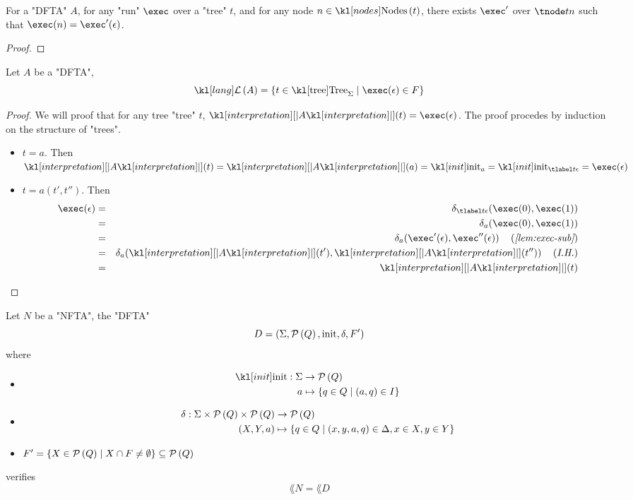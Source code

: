 \documentclass{article}
\begin{document}
\begin{lemma}\label{lem:exec-sub}
	For a "DFTA" $A$, for any "run" $\exec$ over a "tree" $t$, and for any node $n \in \nodes t$, there exists $\exec'$ over
	$\tnode t n$ such that $\exec (n) = \exec'(\epsilon)$.
\end{lemma}

\begin{proof}
	\todo{}
\end{proof}

\begin{lemma}
	Let $A$ be a "DFTA",
	\[ \lang A = \setdef {t \in \tree_{\Sigma}} {\exec (\epsilon) \in F} \]
\end{lemma}

\begin{proof}
	We will proof that for any tree  "tree" $t$, $\interpret A (t) = \exec (\epsilon)$.
	The proof procedes by induction on the structure of "trees".
	\begin{itemize}
		\item $t = a$. Then
		      $\interpret A (t) = \interpret A (a)=  \init_a = \init_{\tlabel t {\epsilon}} = \exec (\epsilon)$
		\item $t = a(t',t'')$. Then
		      \begin{eqnarray*}
			      \exec (\epsilon)  &=& \delta_{\tlabel t {\epsilon}}(\exec (0), \exec (1)) \\
			      &=& \delta_a (\exec (0), \exec (1)) \\
			      &=& \delta_a (\exec' (\epsilon), \exec''  (\epsilon))  \reason{\ref{lem:exec-sub}}\\
			      &=& \delta_a (\interpret A (t'), \interpret A (t'')) \reason{I.H.}\\
			      &=& \interpret A (t)
		      \end{eqnarray*}
	\end{itemize}
\end{proof}

\begin{theorem}
	Let $N$ be a "NFTA", the "DFTA"
	\[ D = (\Sigma, \mathcal{P}\left(Q\right), \text{init} , \delta , F' ) \]
	where
	\begin{itemize}
		\item \begin{align*}
			      \init : \Sigma & \to      \parts Q                        \\
			      a              & \mapsto  \setdef {q \in Q} {(a,q) \in I}
		      \end{align*}
		\item \begin{align*}
			      \delta   : \Sigma \times \mathcal{P}\left(Q\right) \times \mathcal{P}\left(Q\right) & \to \mathcal{P}\left(Q\right)                                                        \\
			      ( X, Y, a)                                        & \mapsto \left\{q \in  Q \mid (x,y,a,q) \in \Delta, x \in X, y \in Y\right\}
		      \end{align*}
		\item $F'  = \left\{X \in \mathcal{P}\left(Q\right) \mid X \cap F \neq \emptyset\right\} \subseteq \mathcal{P}\left(Q\right)$
	\end{itemize}
	verifies
	\[ \lang N = \lang D \]
\end{theorem}
\end{document}
